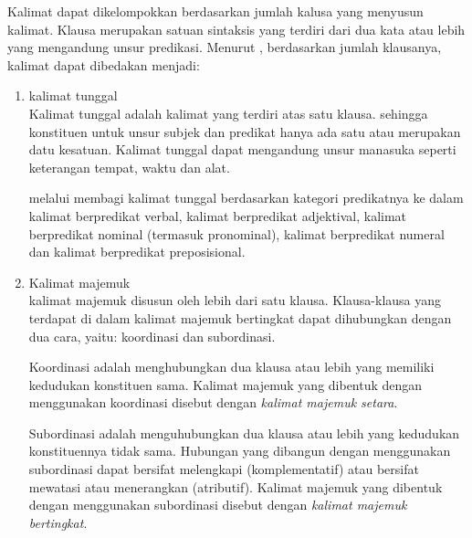 Kalimat dapat dikelompokkan berdasarkan jumlah kalusa yang menyusun kalimat. Klausa merupakan satuan sintaksis yang terdiri dari dua kata atau lebih yang mengandung unsur predikasi. Menurut \citet{alwi}, berdasarkan jumlah klausanya, kalimat dapat dibedakan menjadi:
\begin{enumerate}
	\item kalimat tunggal\\
	Kalimat tunggal adalah kalimat yang terdiri atas satu klausa. sehingga konstituen untuk unsur subjek dan predikat hanya ada satu atau merupakan datu kesatuan. Kalimat tunggal dapat mengandung unsur manasuka seperti keterangan tempat, waktu dan alat.

	\citet{alwi} melalui \citet{suryawan} membagi kalimat tunggal berdasarkan kategori predikatnya ke dalam kalimat  berpredikat verbal, kalimat berpredikat adjektival, kalimat berpredikat nominal (termasuk pronominal), kalimat berpredikat numeral dan kalimat berpredikat preposisional.

	\item Kalimat majemuk\\
	kalimat majemuk disusun oleh lebih dari satu klausa. Klausa-klausa yang terdapat di dalam kalimat majemuk bertingkat dapat dihubungkan dengan dua cara, yaitu: koordinasi dan subordinasi.

	Koordinasi adalah menghubungkan dua klausa atau lebih yang memiliki kedudukan konstituen sama. Kalimat majemuk yang dibentuk dengan menggunakan koordinasi disebut dengan \emph{kalimat majemuk setara}.

	Subordinasi adalah menguhubungkan dua klausa atau lebih yang kedudukan konstituennya tidak sama. Hubungan yang dibangun dengan menggunakan subordinasi dapat bersifat melengkapi (komplementatif) atau bersifat mewatasi atau menerangkan (atributif). Kalimat majemuk yang dibentuk dengan menggunakan subordinasi disebut dengan \emph{kalimat majemuk bertingkat}.
\end{enumerate}

